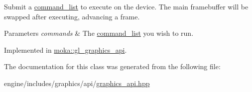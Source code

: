 Submit a \mbox{\hyperlink{classmoka_1_1command__list}{command\+\_\+list}} to execute on the device. The main framebuffer will be swapped after executing, advancing a frame. 


\begin{DoxyParams}{Parameters}
{\em commands} & The \mbox{\hyperlink{classmoka_1_1command__list}{command\+\_\+list}} you wish to run. \\
\hline
\end{DoxyParams}


Implemented in \mbox{\hyperlink{classmoka_1_1gl__graphics__api_af9d00204058312ad8cf09e2d24a32151}{moka\+::gl\+\_\+graphics\+\_\+api}}.



The documentation for this class was generated from the following file\+:\begin{DoxyCompactItemize}
\item 
engine/includes/graphics/api/\mbox{\hyperlink{graphics__api_8hpp}{graphics\+\_\+api.\+hpp}}\end{DoxyCompactItemize}
